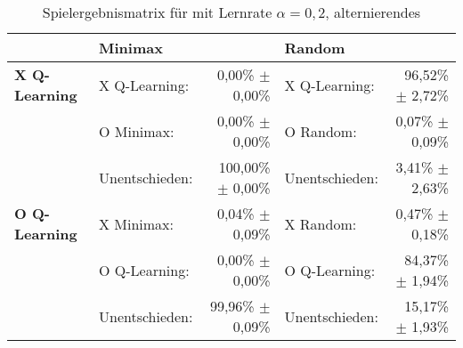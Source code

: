 \begin{table}[ht]
\centering
\caption[Spielergebnismatrix \qlearning: $\alpha=0,2$, alternierendes \splay]{Spielergebnismatrix für \qlearning mit Lernrate $\alpha=0,2$, alternierendes \splay}
\label{tab:resultmatrix_ql_alternate_alpha02}

\begin{tabular}{llrlr}
\toprule
 & \multicolumn{2}{l}{\textbf{Minimax}} & \multicolumn{2}{l}{\textbf{Random}} \\ \midrule
\textbf{X Q-Learning}   & X Q-Learning:     & 0,00\% $\pm$    0,00\%            & X Q-Learning:         & 96,52\% $\pm$ 2,72\%  \\
                        & O Minimax:        & 0,00\% $\pm$    0,00\%            & O Random:             & 0,07\% $\pm$  0,09\%  \\
                        & Unentschieden:    & 100,00\% $\pm$  0,00\%            & Unentschieden:        & 3,41\% $\pm$  2,63\%  \\ \cmidrule{2-5}
\textbf{O Q-Learning}   & X Minimax:        & 0,04\% $\pm$    0,09\%            & X Random:             & 0,47\% $\pm$  0,18\%  \\
                        & O Q-Learning:     & 0,00\% $\pm$    0,00\%            & O Q-Learning:         & 84,37\% $\pm$ 1,94\%  \\
                        & Unentschieden:    & 99,96\% $\pm$   0,09\%            & Unentschieden:        & 15,17\% $\pm$ 1,93\%  \\ \bottomrule
\end{tabular}
\end{table}